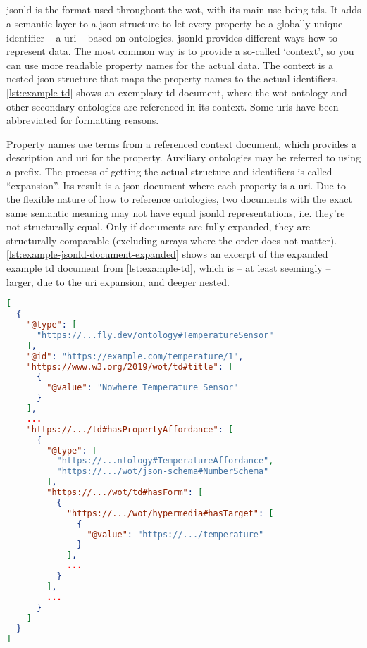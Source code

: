 \subsection{}\label{sec:jsonldinfo}

\gls{jsonld} is the format used throughout the \gls{wot}, with its main use being \glspl{td}. It adds a semantic layer to a \gls{json} structure to let every property be a globally unique identifier -- a \gls{uri} -- based on ontologies. \gls{jsonld} provides different ways how to represent data. The most common way is to provide a so-called \enquote*{context}, so you can use more readable property names for the actual data. The context is a nested \gls{json} structure that maps the property names to the actual identifiers. \autoref{lst:example-td} shows an exemplary \gls{td} document, where the \gls{wot} ontology \cite{w3c.wot.tdo.20230111} and other secondary ontologies are referenced in its context. Some \glspl{uri} have been abbreviated for formatting reasons.

Property names use terms from a referenced context document, which provides a description and \gls{uri} for the property. Auxiliary ontologies may be referred to using a prefix. The process of getting the actual structure and identifiers is called \enquote{expansion}. Its result is a \gls{json} document where each property is a \gls{uri}. Due to the flexible nature of how to reference ontologies, two documents with the exact same semantic meaning may not have equal \gls{jsonld} representations, i.e. they're not structurally equal. Only if documents are fully expanded, they are structurally comparable (excluding arrays where the order does not matter). \autoref{lst:example-jsonld-document-expanded} shows an excerpt of the expanded example \gls{td} document from \autoref{lst:example-td}, which is -- at least seemingly -- larger, due to the \gls{uri} expansion, and deeper nested.

\begin{lstlisting}[language=json,caption={Example \gls{jsonld} document expanded},label={lst:example-jsonld-document-expanded}]
[
  {
    "@type": [
      "https://...fly.dev/ontology#TemperatureSensor"
    ],
    "@id": "https://example.com/temperature/1",
    "https://www.w3.org/2019/wot/td#title": [
      {
        "@value": "Nowhere Temperature Sensor"
      }
    ],
    ...
    "https://.../td#hasPropertyAffordance": [
      {
        "@type": [
          "https://...ntology#TemperatureAffordance",
          "https://.../wot/json-schema#NumberSchema"
        ],
        "https://.../wot/td#hasForm": [
          {
            "https://.../wot/hypermedia#hasTarget": [
              {
                "@value": "https://.../temperature"
              }
            ],
            ...
          }
        ],
        ...
      }
    ]
  }
]
\end{lstlisting}
